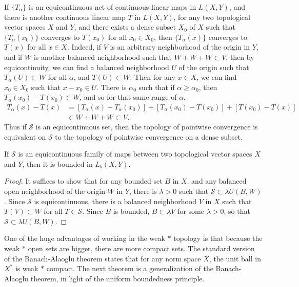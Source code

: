 \begin{remark}
    If $\{ T_\alpha \}$ is an equicontinuous net of continuous linear maps in $L(X,Y)$, and there is another continuous linear map $T$ in $L(X,Y)$, for any two topological vector spaces $X$ and $Y$, and there exists a dense subset $X_0$ of $X$ such that $\{ T_\alpha(x_0) \}$ converges to $T(x_0)$ for all $x_0 \in X_0$, then $\{ T_\alpha(x) \}$ converges to $T(x)$ for all $x \in X$. Indeed, if $V$ is an arbitrary neighborhood of the origin in $Y$, and if $W$ is another balanced neighborhood such that $W + W + W \subset V$, then by equicontinuity, we can find a balanced neighborhood $U$ of the origin such that $T_\alpha(U) \subset W$ for all $\alpha$, and $T(U) \subset W$. Then for any $x \in X$, we can find $x_0 \in X_0$ such that $x - x_0 \in U$. There is $\alpha_0$ such that if $\alpha \geq \alpha_0$, then $T_\alpha(x_0) - T(x_0) \in W$, and so for that same range of $\alpha$,
    \begin{align*}
        T_\alpha(x) - T(x) &= [T_\alpha(x) - T_\alpha(x_0)] + [T_\alpha(x_0) - T(x_0)] + [T(x_0) - T(x)]\\
        &\in W + W + W \subset V.
    \end{align*}
    Thus if $\mathcal{S}$ is an equicontinuous set, then the topology of pointwise convergence is equivalent on $\mathcal{S}$ to the topology of pointwise convergence on a dense subset.
\end{remark}

\begin{theorem}
    If $\mathcal{S}$ is an equicontinuous family of maps between two topological vector spaces $X$ and $Y$, then it is bounded in $L_b(X,Y)$.
\end{theorem}
\begin{proof}
    It suffices to show that for any bounded set $B$ in $X$, and any balanced open neighborhood of the origin $W$ in $Y$, there is $\lambda > 0$ such that $\mathcal{S} \subset \lambda U(B,W)$. Since $\mathcal{S}$ is equicontinuous, there is a balanced neighborhood $V$ in $X$ such that $T(V) \subset W$ for all $T \in \mathcal{S}$. Since $B$ is bounded, $B \subset \lambda V$ for some $\lambda > 0$, so that $\mathcal{S} \subset \lambda U(B,W)$.
\end{proof}

One of the huge advantages of working in the weak $*$ topology is that because the weak $*$ open sets are bigger, there are more compact sets. The standard version of the Banach-Alaoglu theorem states that for any norm space $X$, the unit ball in $X^*$ is weak $*$ compact. The next theorem is a generalization of the Banach-Alaoglu theorem, in light of the uniform boundedness principle.

